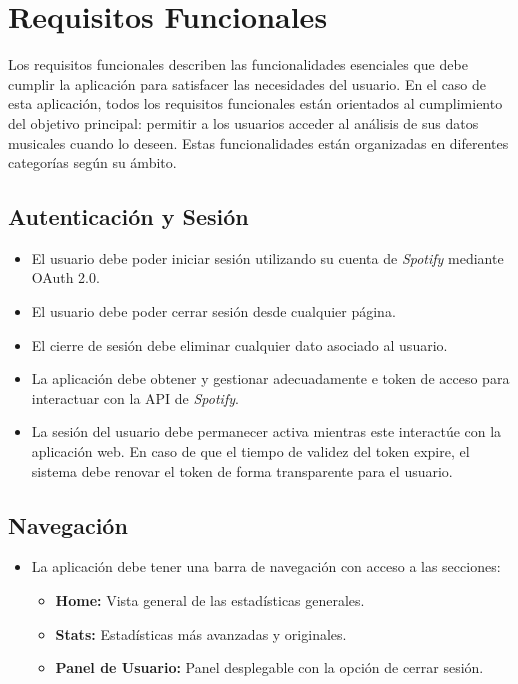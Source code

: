 \section{Requisitos Funcionales}

Los requisitos funcionales describen las funcionalidades esenciales que debe cumplir la aplicación para satisfacer las necesidades del usuario. En el caso de esta aplicación, todos los requisitos funcionales están orientados al cumplimiento del objetivo principal: permitir a los usuarios acceder al análisis de sus datos musicales cuando lo deseen. Estas funcionalidades están organizadas en diferentes categorías según su ámbito.

\subsection{Autenticación y Sesión}
\begin{itemize}
    \item El usuario debe poder iniciar sesión utilizando su cuenta de \textit{Spotify} mediante OAuth 2.0.
    \item El usuario debe poder cerrar sesión desde cualquier página.
    \item El cierre de sesión debe eliminar cualquier dato asociado al usuario.
    \item La aplicación debe obtener y gestionar adecuadamente e token de acceso para interactuar con la API de \textit{Spotify}.
    \item La sesión del usuario debe permanecer activa mientras este interactúe con la aplicación web. En caso de que el tiempo de validez del token expire, el sistema debe renovar el token de forma transparente para el usuario.
\end{itemize}

\subsection{Navegación}
\begin{itemize}
    \item La aplicación debe tener una barra de navegación con acceso a las secciones:
          \begin{itemize}
              \item \textbf{Home:} Vista general de las estadísticas generales.
              \item \textbf{Stats:} Estadísticas más avanzadas y originales.
              \item \textbf{Panel de Usuario:} Panel desplegable con la opción de cerrar sesión. %
          \end{itemize}
\end{itemize}

